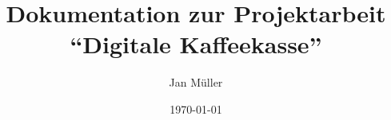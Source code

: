 \documentclass[a4paper, 11pt]{report}
\begin{document}
	
\title{Dokumentation zur Projektarbeit "`Digitale Kaffeekasse"'}
\author{Jan Müller}
\date{\today}

\maketitle

\tableofcontents







\clearpage


\clearpage

\end{document}
